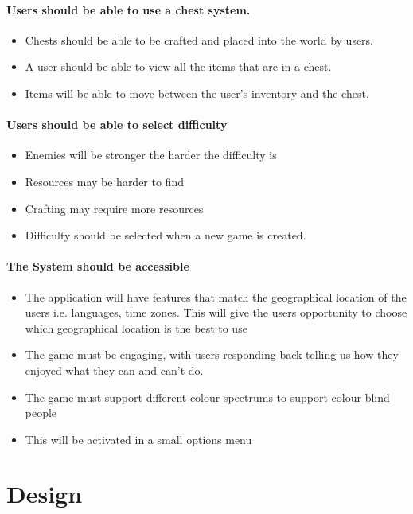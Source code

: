 \documentclass{article}
\begin{document}
\paragraph{Users should be able to use a chest system.}
\begin{itemize}
	\item Chests should be able to be crafted and placed into the world by users.
	\item A user should be able to view all the items that are in a chest.
	\item Items will be able to move between the user's inventory and the chest.
\end{itemize}

\paragraph{Users should be able to select difficulty}
\begin{itemize}
	\item Enemies will be stronger the harder the difficulty is
	\item Resources may be harder to find
	\item Crafting may require more resources
	\item Difficulty should be selected when a new game is created.
\end{itemize}

\paragraph{The System should be accessible}
\begin{itemize}
	\item The application will have features that match the geographical location of the users i.e. languages, time zones. This will give the users opportunity to choose which geographical location is the best to use
	\item The game must be engaging, with users responding back telling us how they enjoyed what they can and can’t do.
	\item The game must support different colour spectrums to support colour
	      blind people
	\item This will be activated in a small options menu
\end{itemize}

\section{Design}%
\label{sec:deign}
\end{document}
